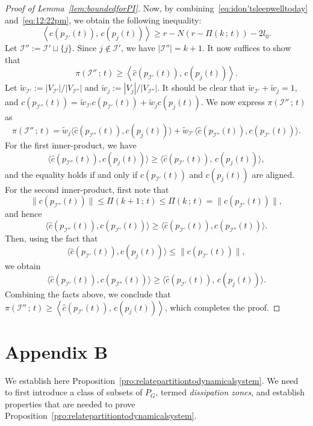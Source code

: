 \documentclass[10pt,twocolumn,twoside]{IEEEtran}
\renewcommand{\cal}{\mathcal}
\renewcommand{\(}{\left (}
\renewcommand{\)}{\right )}
\renewcommand{\;}{\,;\,}
\begin{document}
\begin{proof}[Proof of Lemma~\ref{lem:boundedforPI}]
Now, by combining~\eqref{eq:idon'tsleepwelltoday} and~\eqref{eq:12:22pm}, we obtain the following inequality:
\begin{equation}\label{eq:7:27pmatcaffebene}
 \left\langle  \hat c(p_{\cal{I}'}(t)),\, c(p_{j}(t)) \right\rangle \ge r - N (r - \Pi(k\; t) ) -  2 l_0.
\end{equation}
Let $\cal{I}'':= \cal{I}' \sqcup \{j\}$. Since $j\notin \cal{I}'$, we have $|\cal{I}''| = k+1$. It now suffices to show that 
$$
\pi(\cal{I}''\; t) \ge  \left\langle  \hat c(p_{\cal{I}'}(t)),\, c(p_{j}(t)) \right\rangle. 
$$
Let 
$\tilde w_{\cal{I}'}:= |V_{\cal{I}'}|/|V_{\cal{I}''}|$ and  $\tilde w_j :=   |V_j| / |V_{\cal{I}''}|$. It should be clear that $\tilde w_{\cal{I}'} + \tilde w_{j} = 1$, and $c(p_{\cal{I}''}(t)) =  \tilde w_{\cal{I}'} c(p_{\cal{I}'}(t)) + \tilde w_{j} c(p_j(t))$. We now express $\pi(\cal{I}''\; t)$ as 
$$\pi(\cal{I}''\; t) =  \tilde w_{j} \langle \hat c(p_{\cal{I}''}(t)),c(p_j(t))\rangle +  \tilde w_{\cal{I}'} \langle \hat c(p_{\cal{I}''}(t)),c(p_{\cal{I}'}(t)) \rangle.$$
For the first inner-product, we have  
$$
\langle \hat c(p_{\cal{I}''}(t)), c(p_j(t)) \rangle \ge \langle \hat c(p_{\cal{I}'}(t)),\, c(p_{j}(t)) \rangle,
$$
and the equality holds if and only if $c(p_{\cal{I}'}(t))$ and $c(p_j(t))$ are aligned. For the second inner-product, first note that 
$$ \|c(p_{\cal{I}''}(t))\| \le \Pi(k+1\; t) \le \Pi(k\; t) = \|c(p_{\cal{I}'}(t))\|,$$
and hence
$$
\langle \hat c(p_{\cal{I}''}(t)), c(p_{\cal{I}'}(t)) \rangle \ge\langle \hat c(p_{\cal{I}'}(t)), c(p_{\cal{I}''}(t)) \rangle.
$$
Then, using the fact that $$\langle \hat c(p_{\cal{I}'}(t)), c(p_j(t)) \rangle \le \| c(p_{\cal{I}'}(t))\|,$$ we obtain 
$$
\langle \hat c(p_{\cal{I}'}(t)), c(p_{\cal{I}''}(t)) \rangle \ge  \langle \hat c(p_{\cal{I}'}(t)),\, c(p_{j}(t)) \rangle.
$$
Combining the facts above, we conclude that $\pi(\cal{I}''\; t) \ge  \left\langle  \hat c(p_{\cal{I}'}(t)),\, c(p_{j}(t)) \right\rangle$,  
 which completes the proof. 
\end{proof} 


\section*{Appendix B}
We establish here Proposition~\ref{pro:relatepartitiontodynamicalsystem}. We need to first introduce a class of subsets of $P_G$, termed {\it dissipation zones}, and establish properties  that are needed to prove Proposition~\ref{pro:relatepartitiontodynamicalsystem}. 
\end{document}

